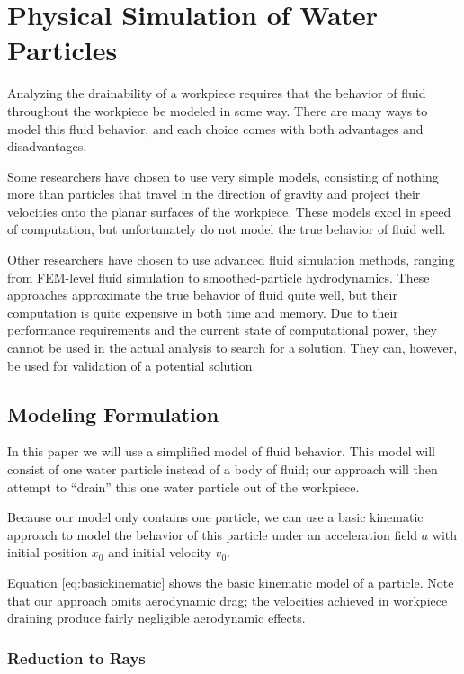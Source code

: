 						\chapter{Physical Simulation of Water Particles}


Analyzing the drainability of a workpiece requires that the behavior of fluid throughout the workpiece be modeled in some way. There are many ways to model this fluid behavior, and each choice comes with both advantages and disadvantages.


Some researchers have chosen to use very simple models, consisting of nothing more than particles that travel in the direction of gravity and project their velocities onto the planar surfaces of the workpiece. These models excel in speed of computation, but unfortunately do not model the true behavior of fluid well.


Other researchers have chosen to use advanced fluid simulation methods, ranging from FEM-level fluid simulation to smoothed-particle hydrodynamics. These approaches approximate the true behavior of fluid quite well, but their computation is quite expensive in both time and memory. Due to their performance requirements and the current state of computational power, they cannot be used in the actual analysis to search for a solution. They can, however, be used for validation of a potential solution.

\section{Modeling Formulation}

In this paper we will use a simplified model of fluid behavior. This model will consist of one water particle instead of a body of fluid; our approach will then attempt to ``drain'' this one water particle out of the workpiece.

Because our model only contains one particle, we can use a basic kinematic approach to model the behavior of this particle under an acceleration field $a$ with initial position $x_0$ and initial velocity $v_0$.



Equation \eqref{eq:basickinematic} shows the basic kinematic model of a particle. Note that our approach omits aerodynamic drag; the velocities achieved in workpiece draining produce fairly negligible aerodynamic effects.


	\subsection{Reduction to Rays}

